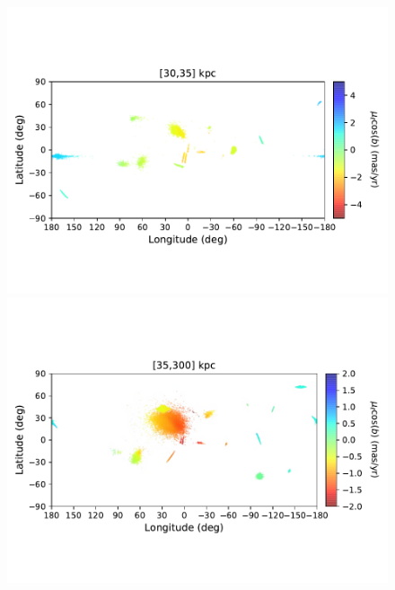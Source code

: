 \begin{figure}[h!]
\begin{center}
            \includegraphics[clip=true, trim = 0mm 20mm 0mm 20mm, width=\columnwidth]{images/PII_ensemble_LB_D30-35_PML_new.pdf}
            \includegraphics[clip=true, trim = 0mm 20mm 0mm 20mm, width=\columnwidth]{images/PII_ensemble_LB_D35-300_PML_new.pdf}


\end{center}
\end{figure}
